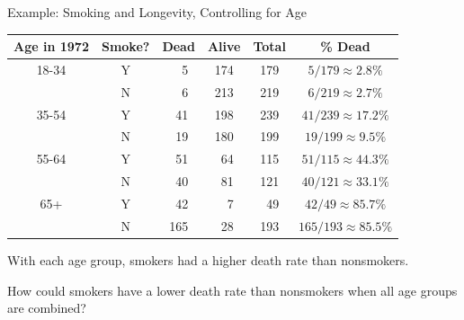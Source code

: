 \documentclass[
  ignorenonframetext,
]{beamer}
\begin{document}
\begin{frame}{Example: Smoking and Longevity, Controlling for Age}
\protect\hypertarget{example-smoking-and-longevity-controlling-for-age}{}
\begin{center}\small
\begin{tabular}{@{}cccccc@{}}
Age in 1972  & Smoke? & Dead & Alive & Total & \% Dead\\\hline\hline
18-34 & Y & ~~5 & 174 & 179 & $5/179\approx2.8\%$ \\
      & N & ~~6 & 213 & 219 & $6/219\approx2.7\%$\\\hline
35-54 & Y & ~41 & 198 & 239 & $41/239\approx17.2\%$\\
      & N & ~19 & 180 & 199 & $19/199\approx9.5\%$\\\hline
55-64 & Y & ~51 & ~64 & 115 & $51/115\approx44.3\%$ \\
      & N & ~40 & ~81 & 121 & $40/121\approx33.1\%$\\\hline
65+   & Y & ~42 & ~~7 & ~49 & $42/49\approx85.7\%$\\
      & N & 165 & ~28 & 193 & $165/193\approx85.5\%$\\\hline
\end{tabular}
\end{center}

With each age group, smokers had a higher death rate than nonsmokers.

How could smokers have a lower death rate than nonsmokers when all age
groups are combined?
\end{frame}
\end{document}
